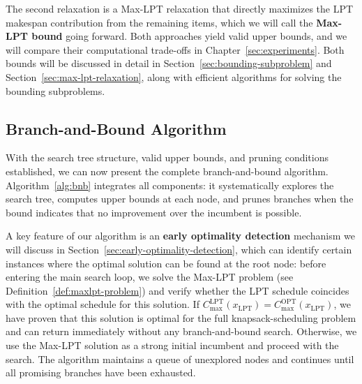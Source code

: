 The second relaxation is a Max-LPT relaxation that directly maximizes the LPT makespan contribution from the remaining items, which we will call the \textbf{Max-LPT bound} going forward.
Both approaches yield valid upper bounds, and we will compare their computational trade-offs in Chapter~\ref{sec:experiments}. 
Both bounds will be discussed in detail in Section~\ref{sec:bounding-subproblem} and Section~\ref{sec:max-lpt-relaxation}, along with efficient algorithms for solving the bounding subproblems.


\subsection{Branch-and-Bound Algorithm}

With the search tree structure, valid upper bounds, and pruning conditions established, we can now present the complete branch-and-bound algorithm. 
Algorithm~\ref{alg:bnb} integrates all components: it systematically explores the search tree, computes upper bounds at each node, and prunes branches when the bound indicates that no improvement over the incumbent is possible. 

A key feature of our algorithm is an \textbf{early optimality detection} mechanism we will discuss in Section~\ref{sec:early-optimality-detection}, which can identify certain instances where the optimal solution can be found at the root node: 
before entering the main search loop, we solve the Max-LPT problem (see Definition~\ref{def:maxlpt-problem}) and verify whether the LPT schedule coincides with the optimal schedule for this solution. If $C_{\max}^{\text{LPT}}(x_{\text{LPT}}) = C_{\max}^{\text{OPT}}(x_{\text{LPT}})$, we have proven that this solution is optimal for the full knapsack-scheduling problem and can return immediately without any branch-and-bound search. 
Otherwise, we use the Max-LPT solution as a strong initial incumbent and proceed with the search. The algorithm maintains a queue of unexplored nodes and continues until all promising branches have been exhausted.


